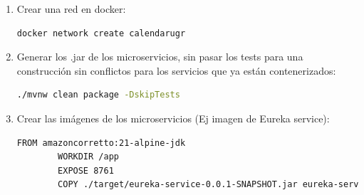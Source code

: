 \begin{enumerate}
    \item Crear una red en docker:
    \begin{lstlisting}[language=bash]
        docker network create calendarugr
    \end{lstlisting}
    \item Generar los .jar de los microservicios, sin pasar los tests para una construcción sin conflictos para los servicios que ya están contenerizados:
    \begin{lstlisting}[language=bash]
        ./mvnw clean package -DskipTests
    \end{lstlisting}
    \item Crear las imágenes de los microservicios (Ej imagen de Eureka service):
    \begin{lstlisting}[language=bash]
        FROM amazoncorretto:21-alpine-jdk
        WORKDIR /app
        EXPOSE 8761
        COPY ./target/eureka-service-0.0.1-SNAPSHOT.jar eureka-service.jar


\end{lstlisting}
\end{enumerate}
